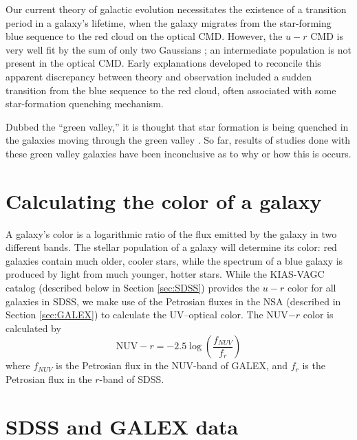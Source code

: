 Our current theory of galactic evolution necessitates the existence of a 
transition period in a galaxy's lifetime, when the galaxy migrates from the 
star-forming blue sequence to the red cloud on the optical CMD.  However, the 
$u-r$ CMD is very well fit by the sum of only two Gaussians \citep{Strateva01, 
Baldry04}; an intermediate population is not present in the optical CMD.  Early 
explanations developed to reconcile this apparent discrepancy between theory and 
observation included a sudden transition from the blue sequence to the red 
cloud, often associated with some star-formation quenching mechanism.

Dubbed the ``green valley,'' it is thought that star formation 
is being quenched in the galaxies moving through the green valley 
\citep{Martin07}.  So far, results of studies done with these green valley 
galaxies have been inconclusive as to why or how this is occurs.




\section[Color Calculations]{Calculating the color of a galaxy}

A galaxy's color is a logarithmic ratio of the flux emitted by the galaxy in two 
different bands.  The stellar population of a galaxy will determine its color: 
red galaxies contain much older, cooler stars, while the spectrum of a blue 
galaxy is produced by light from much younger, hotter stars.  While the 
KIAS-VAGC catalog (described below in Section \ref{sec:SDSS}) provides the $u-r$ 
color for all galaxies in SDSS, we make use of the Petrosian fluxes in the NSA 
(described in Section \ref{sec:GALEX}) to calculate the UV--optical color.  The 
NUV$-r$ color is calculated by
\begin{equation}
    \text{NUV}-r = -2.5\log \left( \frac{f_{NUV}}{f_r} \right)
\end{equation}
where $f_{NUV}$ is the Petrosian flux in the NUV-band of GALEX, and $f_r$ is the 
Petrosian flux in the $r$-band of SDSS.



\section[SDSS Data]{SDSS and GALEX data}

